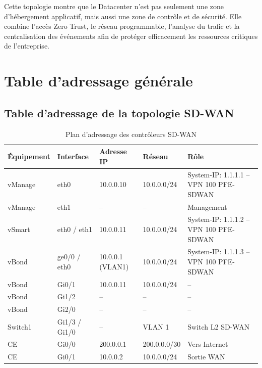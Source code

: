 \documentclass[12pt,a4paper,oneside]{report}
\begin{document}
	Cette topologie montre que le Datacenter n’est pas seulement une zone d’hébergement applicatif, mais aussi une zone de contrôle et de sécurité. Elle combine l’accès Zero Trust, le réseau programmable, l’analyse du trafic et la centralisation des événements afin de protéger efficacement les ressources critiques de l’entreprise.
	
	\section{Table d'adressage générale}
	\subsection{Table d’adressage de la topologie SD-WAN}
	
	
	\begin{table}[H]
		\centering
		\caption{Plan d'adressage des contrôleurs SD-WAN}
		\label{tab:sdwan-controllers}
		
		\begin{tabular}{|p{2.5cm}|p{2.5cm}|p{3cm}|p{3cm}|p{3cm}|}
			\hline
			\textbf{Équipement} & \textbf{Interface} & \textbf{Adresse IP} & \textbf{Réseau} & \textbf{Rôle} \\
			\hline
			vManage & eth0 & 10.0.0.10 & 10.0.0.0/24 & System-IP: 1.1.1.1 -- VPN 100 PFE-SDWAN \\
			\hline
			vManage & eth1 & -- & -- & Management \\
			\hline
			vSmart & eth0 / eth1 & 10.0.0.11 & 10.0.0.0/24 & System-IP: 1.1.1.2 -- VPN 100 PFE-SDWAN \\
			\hline
			vBond & ge0/0 / eth0 & 10.0.0.1 (VLAN1) & 10.0.0.0/24 & System-IP: 1.1.1.3 -- VPN 100 PFE-SDWAN \\
			\hline
			vBond & Gi0/1 & 10.0.0.11 & 10.0.0.0/24 & -- \\
			\hline
			vBond & Gi1/2 & -- & -- & -- \\
			\hline
			vBond & Gi2/0 & -- & -- & -- \\
			\hline
			Switch1 & Gi1/3 / Gi1/0 & -- & VLAN 1 & Switch L2 SD-WAN \\
			\hline
			CE & Gi0/0 & 200.0.0.1 & 200.0.0.0/30 & Vers Internet \\
			\hline
			CE & Gi0/1 & 10.0.0.2 & 10.0.0.0/24 & Sortie WAN \\
			\hline
		\end{tabular}
	\end{table}
	
\end{document}
